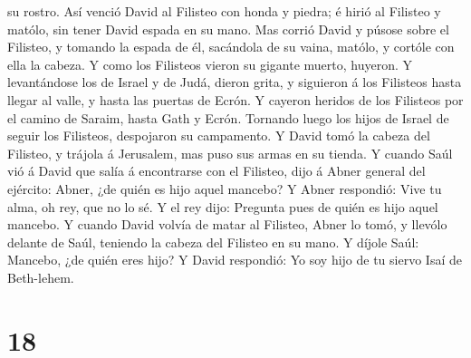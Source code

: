 su rostro.  Así venció David al Filisteo con honda y
piedra; é hirió al Filisteo y matólo, sin tener David espada en su mano.
 Mas corrió David y púsose sobre el Filisteo, y tomando
la espada de él, sacándola de su vaina, matólo, y cortóle con ella la
cabeza. Y como los Filisteos vieron su gigante muerto, huyeron.
 Y levantándose los de Israel y de Judá, dieron grita, y
siguieron á los Filisteos hasta llegar al valle, y hasta las puertas de
Ecrón. Y cayeron heridos de los Filisteos por el camino de Saraim, hasta
Gath y Ecrón.  Tornando luego los hijos de Israel de
seguir los Filisteos, despojaron su campamento.  Y David
tomó la cabeza del Filisteo, y trájola á Jerusalem, mas puso sus armas
en su tienda.  Y cuando Saúl vió á David que salía á
encontrarse con el Filisteo, dijo á Abner general del ejército: Abner,
¿de quién es hijo aquel mancebo? Y Abner respondió:  Vive
tu alma, oh rey, que no lo sé. Y el rey dijo: Pregunta pues de quién es
hijo aquel mancebo.  Y cuando David volvía de matar al
Filisteo, Abner lo tomó, y llevólo delante de Saúl, teniendo la cabeza
del Filisteo en su mano.  Y díjole Saúl: Mancebo, ¿de
quién eres hijo? Y David respondió: Yo soy hijo de tu siervo Isaí de
Beth-lehem.

\hypertarget{section-17}{%
\section{18}\label{section-17}}

